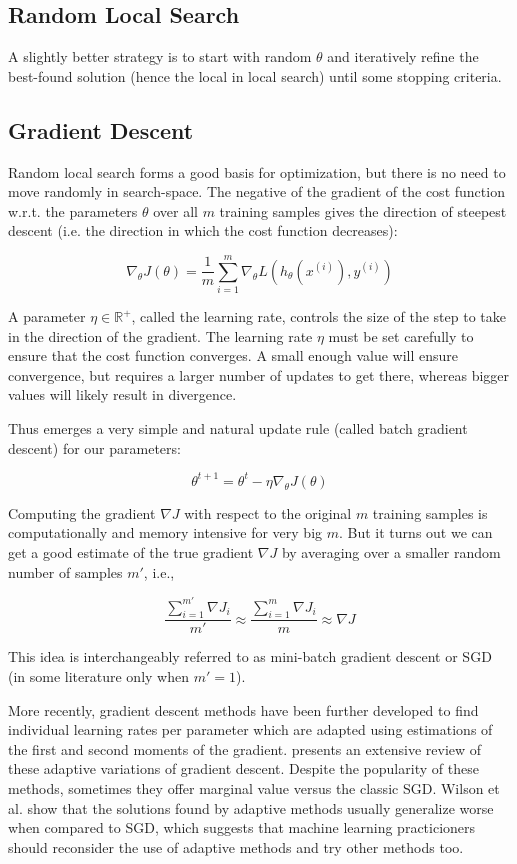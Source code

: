 \subsection{Random Local Search}

A slightly better strategy is to start with random $\theta$ and iteratively refine the best-found solution (hence the local in local search) until some stopping criteria.

\subsection{Gradient Descent}

Random local search forms a good basis for optimization, but there is no need to move randomly in search-space. The negative of the gradient of the cost function w.r.t. the parameters $\theta$ over all $m$ training samples gives the direction of steepest descent (i.e. the direction in which the cost function decreases):

$$
\nabla_{\theta} J(\theta) = \frac{1}{m} \sum_{i=1}^{m} \nabla_{\theta} L(h_{\theta}(x^{(i)}), y^{(i)})
$$

A parameter $\eta \in \mathbb{{R}^{+}}$, called the learning rate, controls the size of the step to take in the direction of the gradient. The learning rate $\eta$ must be set carefully to ensure that the cost function converges. A small enough value will ensure convergence, but requires a larger number of updates to get there, whereas bigger values will likely result in divergence.

Thus emerges a very simple and natural update rule (called batch gradient descent) for our parameters:

$$
\theta^{t+1} = \theta^t - \eta \nabla_{\theta} J(\theta)
$$

Computing the gradient $\nabla J$ with respect to the original $m$ training samples is computationally and memory intensive for very big $m$. But it turns out we can get a good estimate of the true gradient $\nabla J$ by averaging over a smaller random number of samples $m'$, i.e.,

$$
\frac{\sum_{i=1}^{m'} \nabla J_i}{m'} \approx \frac{\sum_{i=1}^m \nabla J_{i}}{m} \approx \nabla J
$$

This idea is interchangeably referred to as mini-batch gradient descent or \ac{SGD} (in some literature only when $m' = 1$).

More recently, gradient descent methods have been further developed to find individual learning rates per parameter which are adapted using estimations of the first and second moments of the gradient. \citeauthor{ruder2016} \cite{ruder2016} presents an extensive review of these adaptive variations of gradient descent. Despite the popularity of these methods, sometimes they offer marginal value versus the classic \ac{SGD}. Wilson et al. \cite{wilson2017} show that the solutions found by adaptive methods usually generalize worse when compared to \ac{SGD}, which suggests that machine learning practicioners should reconsider the use of adaptive methods and try other methods too.

